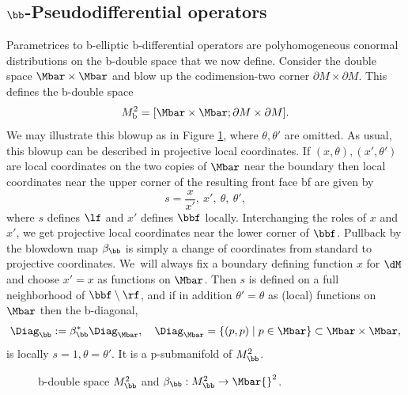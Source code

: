 \subsection{\texorpdfstring{$\bb$}{b}-Pseudodifferential operators}
Parametrices to b-elliptic b-differential operators are polyhomogeneous conormal
distributions on the b-double space that we now define. Consider the double space $\Mbar \times \Mbar$ and
blow up the codimension-two corner $\partial M \times \partial M$. This defines the
b-double space
\begin{equation*}
M^{2}_{\text{b}} =
[ \Mbar \times \Mbar ; \partial M \times \partial M].
\end{equation*}
We may illustrate this blowup as in Figure \ref{figure 1}, where $\theta,\theta'$ are omitted.
As usual, this blowup can be described in projective local coordinates.
If $(x,\theta),(x',\theta')$ are local coordinates on the two copies of $\Mbar$ near the boundary
then local coordinates near the upper corner of the resulting front face bf are given by
\begin{equation}\label{sx}
s = \frac{x}{x'}, \ x',\ \theta, \ \theta',
\end{equation}
where $s$ defines $\lf$ and $x'$ defines $\bbf$ locally. Interchanging the roles of $x$ and $x'$, we get projective local coordinates
near the lower corner of $\bbf$. Pullback by the blowdown map $\beta_\bb$ is simply a change of
coordinates from standard to projective coordinates.
We~will always fix a boundary defining function $x$ for $\dM$ and choose $x'=x$ as functions on $\Mbar$. Then $s$ is defined on a full neighborhood of $\bbf\setminus\rf$, and if in addition $\theta'=\theta$ as (local) functions on $\Mbar$ then the b-diagonal,
\[
\Diag_\bb :=\beta_\bb^*\Diag_\Mbar,\quad \Diag_\Mbar=\{(p,p)\mid p\in \Mbar\}\subset\Mbar\times\Mbar,
\]
is locally $s=1,\theta=\theta'$. It is a p-submanifold of $M^2_\bb$.

\begin{figure}[htb]
\centering

\caption{b-double space $M^{2}_\bb$ and $\beta_\bb: M^{2}_\bb \to \Mbar{}^2$.} \label{figure 1}
\end{figure}

